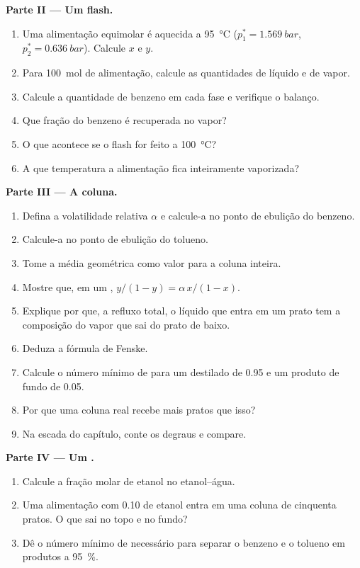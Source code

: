 \begin{problem}
\medskip
\noindent\textbf{Parte II --- Um flash.}
\begin{enumerate}[resume]
  \item Uma alimentação equimolar é aquecida a \qty{95}{\degreeCelsius} ($p_1^* =
        \qty{1.569}{bar}$, $p_2^* = \qty{0.636}{bar}$). Calcule $x$ e $y$.
  \item Para \qty{100}{mol} de alimentação, calcule as quantidades de líquido e de vapor.
  \item Calcule a quantidade de benzeno em cada fase e verifique o balanço.
  \item Que fração do benzeno é recuperada no vapor?
  \item O que acontece se o flash for feito a \qty{100}{\degreeCelsius}?
  \item A que temperatura a alimentação fica inteiramente vaporizada?
\end{enumerate}

\medskip
\noindent\textbf{Parte III --- A coluna.}
\begin{enumerate}[resume]
  \item Defina a volatilidade relativa $\alpha$ e calcule-a no ponto de
        ebulição do benzeno.
  \item Calcule-a no ponto de ebulição do tolueno.
  \item Tome a média geométrica como valor para a coluna inteira.
  \item Mostre que, em um , $y/(1 - y) = \alpha\,x/(1 - x)$.
  \item Explique por que, a refluxo total, o líquido que entra em um prato tem
        a composição do vapor que sai do prato de baixo.
  \item Deduza a fórmula de Fenske.
  \item Calcule o número mínimo de  para um destilado de
        0.95 e um produto de fundo de 0.05.
  \item Por que uma coluna real recebe mais pratos que isso?
  \item Na escada do capítulo, conte os degraus e compare.
\end{enumerate}

\medskip
\noindent\textbf{Parte IV --- Um .}
\begin{enumerate}[resume]
  \item Calcule a fração molar de etanol no  etanol--água.
  \item Uma alimentação com 0.10 de etanol entra em uma coluna de cinquenta
        pratos. O que sai no topo e no fundo?
  \item Dê o número mínimo de  necessário para separar o
        benzeno e o tolueno em produtos a 95~\%.
\end{enumerate}
\end{problem}
